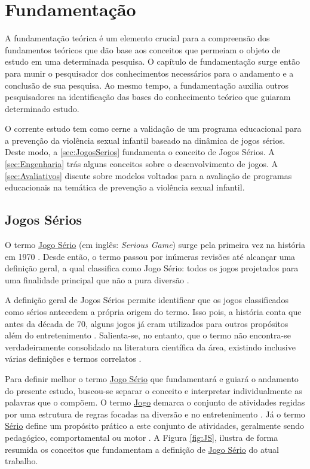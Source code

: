 \chapter{Fundamentação}\label{ch:Fundamentacao}

A fundamentação teórica é um elemento crucial para a compreensão dos fundamentos teóricos que dão base aos conceitos que permeiam o objeto de estudo em uma determinada pesquisa. O capítulo de fundamentação surge então para munir o pesquisador dos conhecimentos necessários para o andamento e a conclusão de sua pesquisa. Ao mesmo tempo, a fundamentação auxilia outros pesquisadores na identificação das bases do conhecimento teórico que guiaram determinado estudo. 

O corrente estudo tem como cerne a validação de um programa educacional para a prevenção da violência sexual infantil baseado na dinâmica de jogos sérios. Deste modo, a \autoref{sec:JogosSerios} fundamenta o conceito de Jogos Sérios. A \autoref{sec:Engenharia} trás alguns conceitos sobre o desenvolvimento de jogos. A \autoref{sec:Avaliativos} discute sobre modelos voltados para a avaliação de programas educacionais na temática de prevenção a violência sexual infantil.


\section{Jogos Sérios}\label{sec:JogosSerios}

O termo \underline{Jo}g\underline{o Sério} (em inglês: \textit{Serious Game}) surge pela primeira vez na história em 1970 \cite{clark1970serious}. Desde então, o termo passou por inúmeras revisões até alcançar uma definição geral, a qual classifica como Jogo Sério: todos os jogos projetados para uma finalidade principal que não a pura diversão \cite{michael2005serious, de2015aprendizagem, laamarti2014overview}.

A definição geral de Jogos Sérios permite identificar que os jogos classificados como sérios antecedem a própria origem do termo. Isso pois, a história conta que antes da década de 70, alguns jogos já eram utilizados para outros propósitos além do entretenimento \cite{wilkinson2016brief}. Salienta-se, no entanto, que o termo não encontra-se verdadeiramente consolidado na literatura científica da área, existindo inclusive várias definições e termos correlatos \cite{pourabdollahian2012serious}.

Para definir melhor o termo \underline{Jo}g\underline{o Sério} que fundamentará e guiará o andamento do presente estudo, buscou-se separar o conceito e interpretar individualmente as palavras que o compõem. O termo \underline{Jo}g\underline{o} demarca o conjunto de atividades regidas por uma estrutura de regras focadas na diversão e no entretenimento \cite{kishimoto1994jogo}. Já o termo \underline{Sério} define um propósito prático a este conjunto de atividades, geralmente sendo pedagógico, comportamental ou motor \cite{schroeder2017wobu, baptista2017jogos}. %
A Figura \ref{fig:JS}, ilustra de forma resumida os conceitos que fundamentam a definição de \underline{Jo}g\underline{o Sério} do atual trabalho.  

